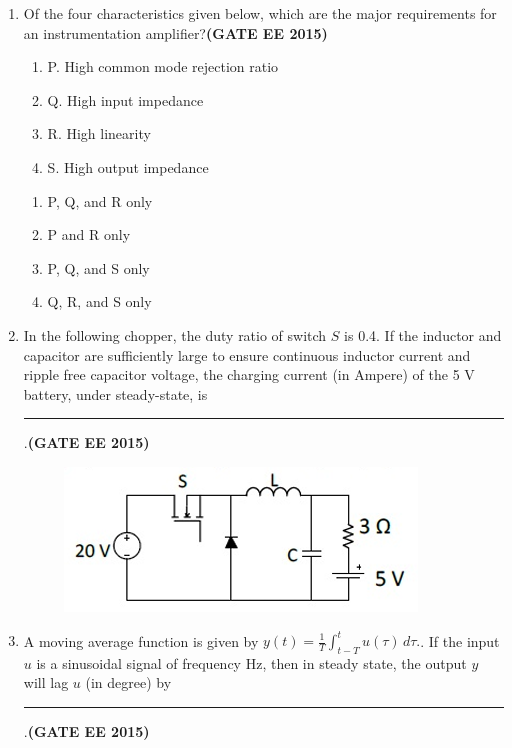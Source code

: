 \documentclass[a4paper,12pt]{exam}
\theoremstyle{remark}
\begin{document}
\begin{enumerate}
\item Of the four characteristics given below, which are the major requirements for an instrumentation amplifier?\hfill{\textbf{(GATE EE 2015)}}
\begin{enumerate}
    \item P. High common mode rejection ratio
    \item Q. High input impedance
    \item R. High linearity
    \item S. High output impedance
\end{enumerate}
\begin{multicols}{2}
\begin{enumerate}
    \item P, Q, and R only
    \item P and R only
    \item P, Q, and S only
    \item Q, R, and S only
\end{enumerate}
\end{multicols}

\item In the following chopper, the duty ratio of switch    $S   $ is 0.4. If the inductor and capacitor are sufficiently large to ensure continuous inductor current and ripple free capacitor voltage, the charging current (in Ampere) of the 5 V battery, under steady-state, is \rule{3cm}{0.15mm}.\hfill{\textbf{(GATE EE 2015)}}
\begin{figure}[h]
    \centering
    \includegraphics[width=0.5\columnwidth]{figs/Q 18.png}
    \caption{}
    \label{fig:placeholder}
\end{figure}
\item A moving average function is given by    $ y(t) =
\frac{1}{T} \int_{t-T}^{t} u(\tau)\, d\tau.
    $. If the input    $u   $ is a sinusoidal signal of frequency Hz, then in steady state, the output    $y   $ will lag    $u   $ (in degree) by \rule{3cm}{0.15mm}.\hfill{\textbf{(GATE EE 2015)}}


\end{enumerate}
\end{document}
